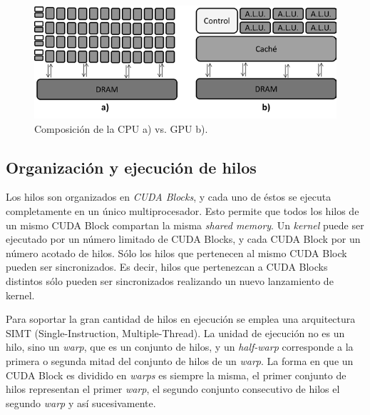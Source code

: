 \begin{figure}
\begin{center}
   \includegraphics[width=12cm]{fig/ab.png}
\end{center}
\caption{\label{fig:composicion}Composición de la CPU a) vs. GPU b).}
\end{figure}


\subsection*{Organización y ejecución de hilos}

Los hilos son organizados en \textit{CUDA Blocks}, y cada uno de éstos se ejecuta completamente en un único multiprocesador. Esto permite que todos los hilos de un mismo CUDA Block compartan la misma \textit{shared memory}.
Un \textit{kernel} puede ser ejecutado por un número limitado de CUDA Blocks, y cada CUDA Block por un número acotado de hilos. Sólo los hilos que pertenecen al mismo CUDA Block pueden ser sincronizados. Es decir, hilos que pertenezcan a CUDA Blocks distintos sólo pueden ser sincronizados realizando un nuevo lanzamiento de kernel.

Para soportar la gran cantidad de hilos en ejecución se emplea una arquitectura SIMT (Single-Instruction, Multiple-Thread). La unidad de ejecución no es un hilo, sino un \textit{warp}, que es un conjunto de hilos, y un \textit{half-warp} corresponde a la primera o segunda mitad del conjunto de hilos de un \textit{warp}. La forma en que un CUDA Block es dividido en \textit{warps} es siempre la misma, el primer conjunto de hilos representan el primer \textit{warp}, el segundo conjunto consecutivo de hilos el segundo \textit{warp} y así sucesivamente.\\\\

